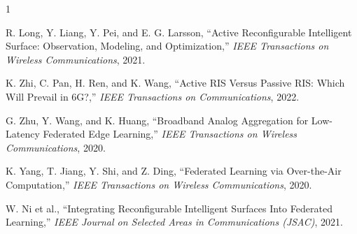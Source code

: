 \documentclass[lettersize,journal]{IEEEtran}
\begin{document}
\begin{thebibliography}{1}


R. Long, Y. Liang, Y. Pei, and E. G. Larsson, ``Active Reconfigurable Intelligent Surface: Observation, Modeling, and Optimization,'' \textit{IEEE Transactions on Wireless Communications}, 2021.

K. Zhi, C. Pan, H. Ren, and K. Wang, ``Active RIS Versus Passive RIS: Which Will Prevail in 6G?,'' \textit{IEEE Transactions on Communications}, 2022.

G. Zhu, Y. Wang, and K. Huang, ``Broadband Analog Aggregation for Low-Latency Federated Edge Learning,'' \textit{IEEE Transactions on Wireless Communications}, 2020.

K. Yang, T. Jiang, Y. Shi, and Z. Ding, ``Federated Learning via Over-the-Air Computation,'' \textit{IEEE Transactions on Wireless Communications}, 2020.

W. Ni et al., ``Integrating Reconfigurable Intelligent Surfaces Into Federated Learning,'' \textit{IEEE Journal on Selected Areas in Communications (JSAC)}, 2021.

\end{thebibliography}
\end{document}
